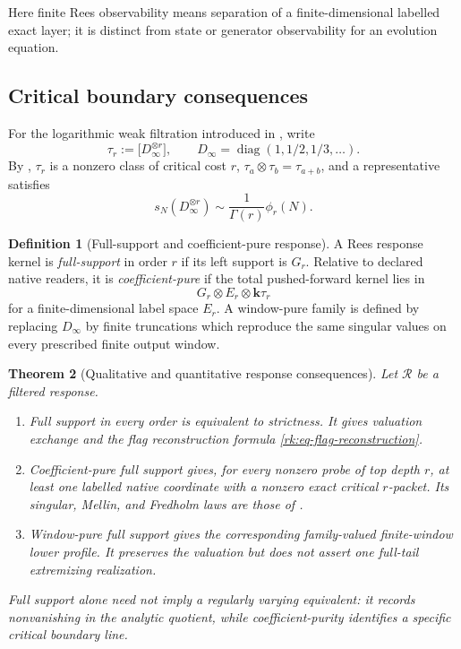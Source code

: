 \documentclass[10pt,reqno]{amsart}
\theoremstyle{plain}
\newtheorem{theorem}{Theorem}[section]
\theoremstyle{definition}
\newtheorem{definition}[theorem]{Definition}
\theoremstyle{remark}
\begin{document}
Here finite Rees observability means separation of a finite-dimensional
labelled exact layer; it is distinct from state or generator observability for
an evolution equation.

\subsection{Critical boundary consequences}
\label{rk:subsec-critical-consequences}

For the logarithmic weak filtration introduced in
, write
\[
 \tau_r:=\bigl[D_\infty^{\otimes r}\bigr],
 \qquad
 D_\infty=\operatorname{diag}(1,1/2,1/3,\ldots).
\]
By , $\tau_r$ is a nonzero class of
critical cost $r$, $\tau_a\otimes\tau_b=\tau_{a+b}$, and a representative
satisfies
\begin{equation}
 s_N(D_\infty^{\otimes r})
 \sim\frac1{\Gamma(r)}\phi_r(N).
 \label{rk:eq-critical-boundary-line}
\end{equation}

\begin{definition}[Full-support and coefficient-pure response]
\label{rk:def-full-pure}
A Rees response kernel is \emph{full-support} in order $r$ if its left
support is $G_r$.  Relative to declared native readers, it is
\emph{coefficient-pure} if the total pushed-forward kernel lies in
\[
 G_r\otimes E_r\otimes\mathbf k\tau_r
\]
for a finite-dimensional label space $E_r$.  A window-pure family is defined
by replacing $D_\infty$ by finite truncations which reproduce the same
singular values on every prescribed finite output window.
\end{definition}

\begin{theorem}[Qualitative and quantitative response consequences]
\label{rk:thm-response-consequences}
Let $\mathcal R$ be a filtered response.
\begin{enumerate}[label=\textup{(\roman*)},leftmargin=2.8em]
\item Full support in every order is equivalent to strictness.  It gives
      valuation exchange and the flag reconstruction formula
      \eqref{rk:eq-flag-reconstruction}.
\item Coefficient-pure full support gives, for every nonzero probe of top
      depth $r$, at least one labelled native coordinate with a nonzero exact
      critical $r$-packet.  Its singular, Mellin, and Fredholm laws are those
      of .
\item Window-pure full support gives the corresponding family-valued
      finite-window lower profile.  It preserves the valuation but does not
      assert one full-tail extremizing realization.
\end{enumerate}
Full support alone need not imply a regularly varying equivalent: it records
nonvanishing in the analytic quotient, while coefficient-purity identifies a
specific critical boundary line.
\end{theorem}
\end{document}

